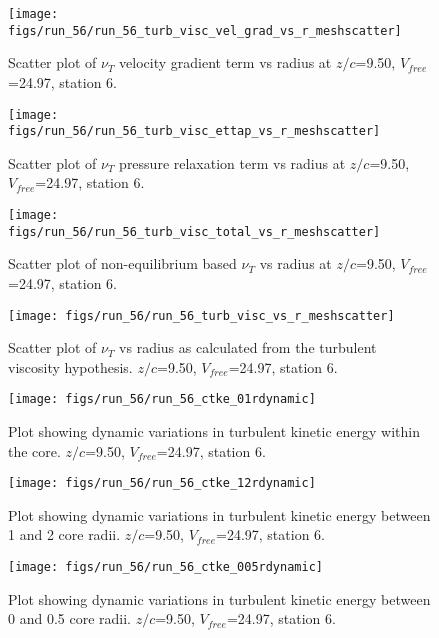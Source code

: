 \begin{figure}[H]
\centering
\texttt{[image: figs/run\_56/run\_56\_turb\_visc\_vel\_grad\_vs\_r\_meshscatter]}
\caption{Scatter plot of $\nu_T$ velocity gradient term vs radius at $z/c$=9.50, $V_{free}$=24.97, station 6.}
\end{figure}


\begin{figure}[H]
\centering
\texttt{[image: figs/run\_56/run\_56\_turb\_visc\_ettap\_vs\_r\_meshscatter]}
\caption{Scatter plot of $\nu_T$ pressure relaxation term vs radius at $z/c$=9.50, $V_{free}$=24.97, station 6.}
\end{figure}


\begin{figure}[H]
\centering
\texttt{[image: figs/run\_56/run\_56\_turb\_visc\_total\_vs\_r\_meshscatter]}
\caption{Scatter plot of non-equilibrium based $\nu_T$ vs radius at $z/c$=9.50, $V_{free}$=24.97, station 6.}
\end{figure}


\begin{figure}[H]
\centering
\texttt{[image: figs/run\_56/run\_56\_turb\_visc\_vs\_r\_meshscatter]}
\caption{Scatter plot of $\nu_T$ vs radius as calculated from the turbulent viscosity hypothesis. $z/c$=9.50, $V_{free}$=24.97, station 6.}
\end{figure}


\begin{figure}[H]
\centering
\texttt{[image: figs/run\_56/run\_56\_ctke\_01rdynamic]}
\caption{Plot showing dynamic variations in turbulent kinetic energy within the core. $z/c$=9.50, $V_{free}$=24.97, station 6.}
\end{figure}


\begin{figure}[H]
\centering
\texttt{[image: figs/run\_56/run\_56\_ctke\_12rdynamic]}
\caption{Plot showing dynamic variations in turbulent kinetic energy between 1 and 2 core radii. $z/c$=9.50, $V_{free}$=24.97, station 6.}
\end{figure}


\begin{figure}[H]
\centering
\texttt{[image: figs/run\_56/run\_56\_ctke\_005rdynamic]}
\caption{Plot showing dynamic variations in turbulent kinetic energy between 0 and 0.5 core radii. $z/c$=9.50, $V_{free}$=24.97, station 6.}
\end{figure}


